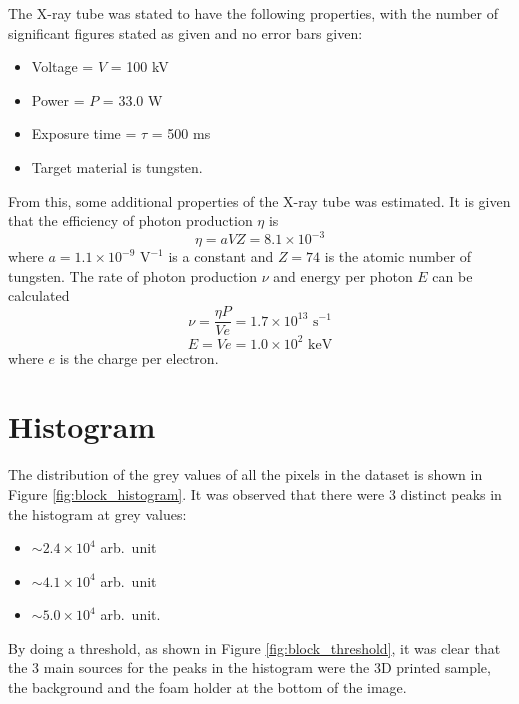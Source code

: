 \documentclass[12pt]{report}
\begin{document}
The X-ray tube was stated to have the following properties, with the number of significant figures stated as given and no error bars given:
\begin{itemize}
	\item Voltage = $V$ = 100 kV
	\item Power = $P$ = 33.0 W
	\item Exposure time = $\tau$ = 500 ms
	\item Target material is tungsten.
\end{itemize}
From this, some additional properties of the X-ray tube was estimated. It is given that the efficiency of photon production $\eta$ is \cite{michael2001x}
\begin{equation}
\eta = aVZ =8.1\times10^{-3}
\end{equation}
where $a=1.1\times 10^{-9}\text{ V}^{-1}$ is a constant and $Z=74$ is the atomic number of tungsten. The rate of photon production $\nu$ and energy per photon $E$ can be calculated
\begin{equation}
\nu =\frac{\eta P}{V e}=1.7\times10^{13}\text{ s}^{-1}
\end{equation}
\begin{equation}
E = Ve = 1.0\times10^{2}\text{ keV}
\end{equation}
where $e$ is the charge per electron.

\section{Histogram}
The distribution of the grey values of all the pixels in the dataset is shown in Figure \ref{fig:block_histogram}. It was observed that there were 3 distinct peaks in the histogram at grey values:
\begin{itemize}
	\item$\sim2.4\times10^4$ arb.~unit
	\item$\sim4.1\times10^4$ arb.~unit
	\item$\sim5.0\times10^4$ arb.~unit.
\end{itemize}
By doing a threshold, as shown in Figure \ref{fig:block_threshold}, it was clear that the 3 main sources for the peaks in the histogram were the 3D printed sample, the background and the foam holder at the bottom of the image.
\end{document}
